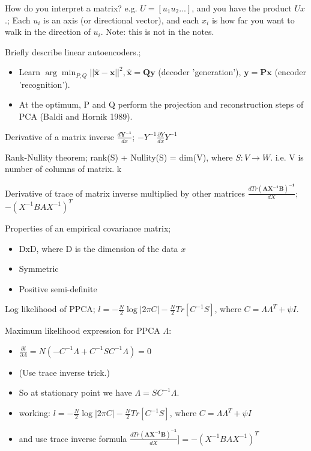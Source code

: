 \documentclass{article}
\begin{document}
How do you interpret a matrix? e.g. $U = [u_1 u_2 ...]$, and you have the product $Ux$.; Each $u_i$ is an axis (or directional vector), and each $x_i$ is how far you want to walk in the direction of $u_i$. \newline Note: this is not in the notes.

Briefly describe linear autoencoders.; \begin{itemize} \item Learn $\arg\min_{P,Q}||\hat{\mathbf{x}}-\mathbf{x}||^2, \mathbf{\hat{x}=Qy}$ (decoder 'generation'), $\mathbf{y=Px}$ (encoder 'recognition').  \item At the optimum, P and Q perform the projection and reconstruction steps of PCA (Baldi and Hornik 1989).  \end{itemize}

Derivative of a matrix inverse $\frac{d\mathbf{Y^{-1}}}{dx}$; $-Y^{-1}\frac{\partial{Y}}{dx}Y^{-1}$

Rank-Nullity theorem; rank(S) + Nullity(S) = dim(V), where $S:V\to W$. i.e. V is number of columns of matrix. k

Derivative of trace of matrix inverse multiplied by other matrices $\frac{d Tr \mathbf{(AX^{-1}B)^{-1}}}{dX}$; $-(X^{-1}BAX^{-1})^T$

Properties of an empirical covariance matrix; \begin{itemize}
	\item DxD, where D is the dimension of the data $x$
	\item Symmetric
	\item Positive semi-definite
\end{itemize}

Log likelihood of PPCA; $l = -\frac{N}{2}\log|2\pi C|-\frac{N}{2}Tr[C^{-1}S]$, where $C=\Lambda\Lambda^T+\psi I$.

Maximum likelihood expression for PPCA $\Lambda$: \begin{itemize}
	\item $\frac{\partial l}{\partial \Lambda} = N(-C^{-1}\Lambda+C^{-1}SC^{-1}\Lambda) = 0$
	\item (Use trace inverse trick.)
	\item So at stationary point we have $\Lambda = SC^{-1}\Lambda$.
	\item working: $l = -\frac{N}{2}\log|2\pi C|-\frac{N}{2}Tr[C^{-1}S]$, where $C=\Lambda\Lambda^T+\psi I$
	\item and use trace inverse formula $\frac{d Tr \mathbf{(AX^{-1}B)^{-1}}}{dX}] = -(X^{-1}BAX^{-1})^T$
\end{itemize}
\end{document}
